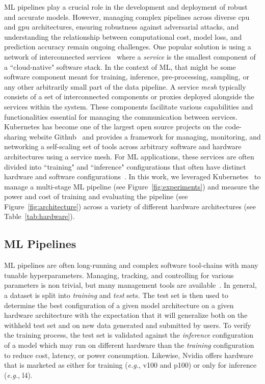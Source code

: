 \documentclass[conference]{IEEEtran}
\begin{document}
ML pipelines play a crucial role in the development and deployment of robust and accurate models. However, managing complex pipelines across diverse \acrfull{cpu} and \acrfull{gpu}  architectures, ensuring robustness against adversarial attacks, and understanding the relationship between computational cost, model loss, and prediction accuracy remain ongoing challenges.
One popular solution is using a network of interconnected services~\cite{panchal2024reusable,hasselbring2017microservice,zhou2022online,singh2023load} where a \textit{service} is the smallest component of a ``cloud-native" software stack. In the context of ML, that might be some software component meant for training, inference, pre-processing, sampling, or any other arbitrarily small part of the data pipeline. 
A service \textit{mesh} typically consists of a set of interconnected components or proxies deployed alongside the services within the system.  These components facilitate various capabilities and functionalities essential for managing the communication between services. Kubernetes has become one of the largest open source projects on the code-sharing website Github~\cite{k8s-size} and provides a framework for managing, monitoring, and networking a self-scaling set of tools across arbitrary software and hardware architectures using a service mesh. For ML applications, these services are often divided into ``training" and ``inference" configurations that often have distinct hardware and software configurations~\cite{wang2019benchmarking}. In this work, we leveraged Kubernetes~\cite{k8s} to manage a multi-stage ML pipeline (see Figure~\ref{fig:experiments}) and measure the power and cost of training and evaluating the pipeline (see Figure~\ref{fig:architecture}) across a variety of different hardware architectures (see Table~\ref{tab:hardware}).


\subsection{ML Pipelines}
ML pipelines are often long-running and complex software tool-chains with many tunable hyperparameters. Managing, tracking, and controlling for various parameters is non trivial, but many management tools are available~\cite{dvc,hydra,k8s}. In general, a dataset is split into \textit{training} and \textit{test} sets. The test set is then used to determine the best configuration of a given model architecture on a given hardware architecture with the expectation that it will generalize both on the withheld test set and on new data generated and submitted by users. To verify the training process, the test set is validated against the \textit{inference} configuration of a model which may run on different hardware than the \textit{training} configuration to reduce cost, latency, or power consumption. Likewise, Nvidia offers hardware that is marketed as either for training (\textit{e.g.}, v100 and p100) or only for inference (\textit{e.g.}, l4).
\end{document}

